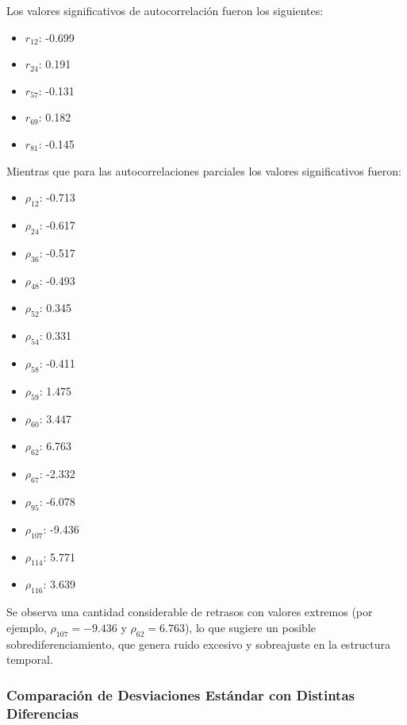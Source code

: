\documentclass[12pt,letterpaper]{article}   %
\begin{document}
\vspace{1em}


Los valores significativos de autocorrelación fueron los siguientes: \begin{multicols}{5} \scriptsize \begin{itemize} \item $r_{12}$: -0.699 \item $r_{24}$: 0.191 \item $r_{57}$: -0.131 \item $r_{69}$: 0.182 \item $r_{81}$: -0.145 \end{itemize} \end{multicols}{}

\vspace{1em}

\normalsize Mientras que para las autocorrelaciones parciales los valores significativos fueron: \begin{multicols}{5} \scriptsize \begin{itemize} \item $\rho_{12}$: -0.713 \item $\rho_{24}$: -0.617 \item $\rho_{36}$: -0.517 \item $\rho_{48}$: -0.493 \item $\rho_{52}$: 0.345 \item $\rho_{54}$: 0.331 \item $\rho_{58}$: -0.411 \item $\rho_{59}$: 1.475 \item $\rho_{60}$: 3.447 \item $\rho_{62}$: 6.763 \item $\rho_{67}$: -2.332 \item $\rho_{95}$: -6.078 \item $\rho_{107}$: -9.436 \item $\rho_{114}$: 5.771 \item $\rho_{116}$: 3.639 \end{itemize} \end{multicols}{}

Se observa una cantidad considerable de retrasos con valores extremos (por ejemplo, $\rho_{107} = -9.436$ y $\rho_{62} = 6.763$), lo que sugiere un posible sobrediferenciamiento, que genera ruido excesivo y sobreajuste en la estructura temporal.




    \subsubsection{Comparación de Desviaciones Estándar con Distintas Diferencias}
\end{document}
